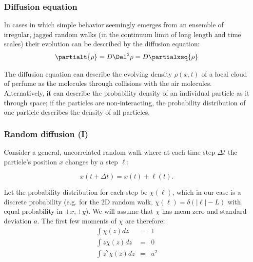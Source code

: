 \documentclass[hyperref={colorlinks=true}]{beamer}
\begin{document}

\begin{frame}%
  \frametitle{Diffusion equation}
  
  In cases in which simple behavior seemingly emerges from an ensemble of irregular, jagged random walks (in the continuum limit of long length and time scales) their evolution can be described by the diffusion equation:
  \begin{equation}
    \partialt{\rho} = D \Del^2 \rho = D \partialxsq{\rho}
    \label{eq:diffusion}
  \end{equation}
  
  The diffusion equation can describe the evolving density $\rho(x, t)$ of a local cloud of perfume as the molecules  through collisions with the air molecules. Alternatively, it can describe the probability density of an individual particle as it  through space; if the particles are non-interacting, the probability distribution of one particle describes the density of all particles.
  
\end{frame}


\begin{frame}%
  \frametitle{Random diffusion (I)}
  
  Consider a general, uncorrelated random walk where at each time step $\Delta t$ the particle's position $x$ changes by a step $\ell$:
  
  \begin{equation}
    x(t + \Delta t) = x(t) + \ell(t).
  \end{equation}
  
  Let the probability distribution for each step be $\chi(\ell)$, which in our case is a discrete probability (e.g. for the 2D random walk, $\chi(\ell) = \delta (|\ell| - L)$ with equal probability in $\pm x, \pm y$). We will assume that $\chi$ has mean zero and standard deviation $a$. The first few moments of $\chi$ are therefore:
  \begin{eqnarray}
    \int \chi(z) dz     &=& 1   \\
    \int z \chi(z) dz   &=& 0   \\
    \int z^2 \chi(z) dz &=& a^2  
  \end{eqnarray}

\end{frame}
\end{document}
